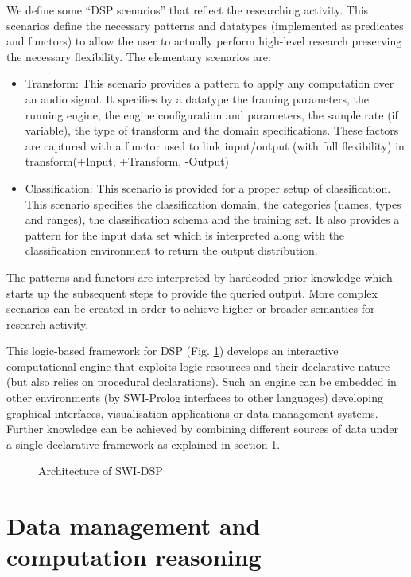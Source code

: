 \documentclass[runningheads]{llncs}
\begin{document}
We define some ``DSP scenarios'' that reflect the researching activity. This scenarios define the necessary patterns and datatypes (implemented as predicates and functors) to allow the user to actually perform high-level research preserving the necessary flexibility. The elementary scenarios are:

\begin{itemize}
 \item Transform: This scenario provides a pattern to apply any computation over an audio signal. It specifies by a datatype the framing parameters, the running engine, the engine configuration and parameters, the sample rate (if variable), the type of transform and the domain specifications. These factors are captured with a functor used to link input/output (with full flexibility) in transform(+Input, +Transform, -Output)
 \item Classification: This scenario is provided for a proper setup of classification. This scenario specifies the classification domain, the categories (names, types and ranges), the classification schema and the training set. It also provides a pattern for the input data set which is interpreted along with the classification environment to return the output distribution.
\end{itemize}

The patterns and functors are interpreted by hardcoded prior knowledge which starts up the subsequent steps to provide the queried output. More complex scenarios can be created in order to achieve higher or broader semantics for research activity.

This logic-based framework for DSP (Fig. \ref{fig:dspdrawing}) develops an interactive computational engine that exploits logic resources and their declarative nature (but also relies on procedural declarations). Such an engine can be embedded in other environments (by SWI-Prolog interfaces to other languages) developing graphical interfaces, visualisation applications or data management systems. Further knowledge can be achieved by combining different sources of data under a single declarative framework as explained in section \ref{sec:datamanage}.

\begin{figure}
\centerline{}
\caption{Architecture of SWI-DSP}
\label{fig:dspdrawing}
\end{figure}

\section{Data management and computation reasoning}\label{sec:datamanage}
\end{document}
